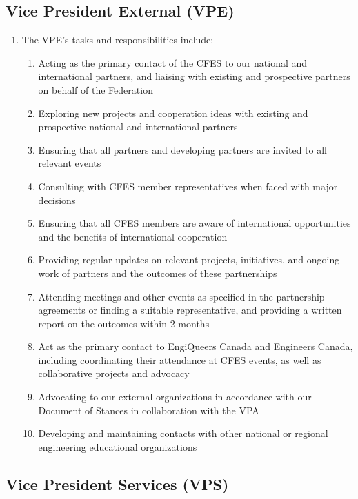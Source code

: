 \subsection{Vice President External (VPE)}
\label{vice-president-external-vpe}

\begin{enumerate}
 \item
  The VPE's tasks and responsibilities include:

  \begin{enumerate}
   \item
    Acting as the primary contact of the CFES to our national and international partners, and liaising with existing and prospective partners on behalf of the Federation
   \item
    Exploring new projects and cooperation ideas with existing and prospective national and international partners
   \item
    Ensuring that all partners and developing partners are invited to all relevant events
   \item
    Consulting with CFES member representatives when faced with major decisions
   \item
    Ensuring that all CFES members are aware of international opportunities and the benefits of international cooperation
   \item
    Providing regular updates on relevant projects, initiatives, and ongoing work of partners and the outcomes of these partnerships
   \item
    Attending meetings and other events as specified in the partnership agreements or finding a suitable representative, and providing a written report on the outcomes within 2 months
   \item
    Act as the primary contact to EngiQueers Canada and Engineers Canada, including coordinating their attendance at CFES events, as well as collaborative projects and advocacy
   \item
    Advocating to our external organizations in accordance with our Document of Stances in collaboration with the VPA
   \item
    Developing and maintaining contacts with other national or regional engineering educational organizations

  \end{enumerate}

\end{enumerate}

\subsection{Vice President Services (VPS)}
\label{vice-president-services-vps}

